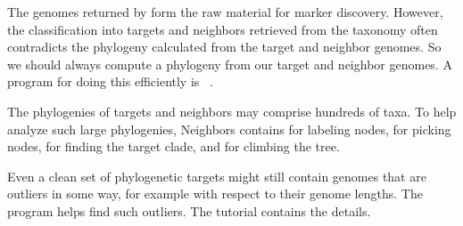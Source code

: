 The genomes returned by  form the raw material for
marker discovery. However, the classification into targets and
neighbors retrieved from the taxonomy often contradicts the phylogeny
calculated from the target and neighbor genomes. So we should always
compute a phylogeny from our target and neighbor genomes. A program
for doing this efficiently is ~\cite{klo20:phy}.

The phylogenies of targets and neighbors may comprise hundreds of
taxa. To help analyze such large phylogenies, Neighbors
contains  for labeling nodes,  for picking nodes,
 for finding the target clade, and  for climbing
the tree.

Even a clean set of phylogenetic targets might still contain genomes
that are outliers in some way, for example with respect to their
genome lengths. The program  helps find such
outliers. The tutorial contains the details.
